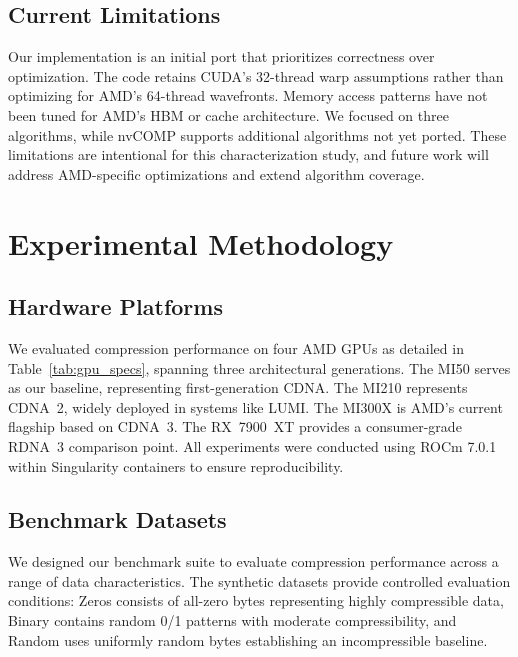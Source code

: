 \documentclass[runningheads]{llncs}
\begin{document}
\subsection{Current Limitations}

Our implementation is an initial port that prioritizes correctness over optimization. The code retains CUDA's 32-thread warp assumptions rather than optimizing for AMD's 64-thread wavefronts. Memory access patterns have not been tuned for AMD's HBM or cache architecture. We focused on three algorithms, while nvCOMP supports additional algorithms not yet ported. These limitations are intentional for this characterization study, and future work will address AMD-specific optimizations and extend algorithm coverage.


\section{Experimental Methodology}
\label{sec:methodology}

\subsection{Hardware Platforms}

We evaluated compression performance on four AMD GPUs as detailed in Table~\ref{tab:gpu_specs}, spanning three architectural generations. The MI50 serves as our baseline, representing first-generation CDNA. The MI210 represents CDNA~2, widely deployed in systems like LUMI. The MI300X is AMD's current flagship based on CDNA~3. The RX~7900~XT provides a consumer-grade RDNA~3 comparison point. All experiments were conducted using ROCm 7.0.1 within Singularity containers to ensure reproducibility.

\subsection{Benchmark Datasets}

We designed our benchmark suite to evaluate compression performance across a range of data characteristics. The synthetic datasets provide controlled evaluation conditions: Zeros consists of all-zero bytes representing highly compressible data, Binary contains random 0/1 patterns with moderate compressibility, and Random uses uniformly random bytes establishing an incompressible baseline.
\end{document}
